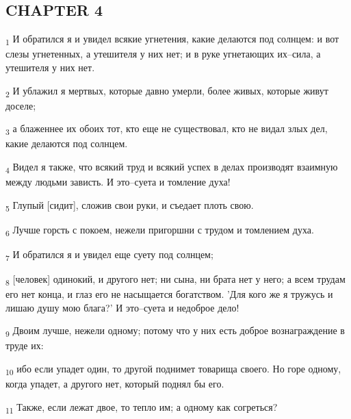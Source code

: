 \subsection{CHAPTER 4}
\begin{tcolorbox}
\textsubscript{1} И обратился я и увидел всякие угнетения, какие делаются под солнцем: и вот слезы угнетенных, а утешителя у них нет; и в руке угнетающих их--сила, а утешителя у них нет.
\end{tcolorbox}
\begin{tcolorbox}
\textsubscript{2} И ублажил я мертвых, которые давно умерли, более живых, которые живут доселе;
\end{tcolorbox}
\begin{tcolorbox}
\textsubscript{3} а блаженнее их обоих тот, кто еще не существовал, кто не видал злых дел, какие делаются под солнцем.
\end{tcolorbox}
\begin{tcolorbox}
\textsubscript{4} Видел я также, что всякий труд и всякий успех в делах производят взаимную между людьми зависть. И это--суета и томление духа!
\end{tcolorbox}
\begin{tcolorbox}
\textsubscript{5} Глупый [сидит], сложив свои руки, и съедает плоть свою.
\end{tcolorbox}
\begin{tcolorbox}
\textsubscript{6} Лучше горсть с покоем, нежели пригоршни с трудом и томлением духа.
\end{tcolorbox}
\begin{tcolorbox}
\textsubscript{7} И обратился я и увидел еще суету под солнцем;
\end{tcolorbox}
\begin{tcolorbox}
\textsubscript{8} [человек] одинокий, и другого нет; ни сына, ни брата нет у него; а всем трудам его нет конца, и глаз его не насыщается богатством. 'Для кого же я тружусь и лишаю душу мою блага?' И это--суета и недоброе дело!
\end{tcolorbox}
\begin{tcolorbox}
\textsubscript{9} Двоим лучше, нежели одному; потому что у них есть доброе вознаграждение в труде их:
\end{tcolorbox}
\begin{tcolorbox}
\textsubscript{10} ибо если упадет один, то другой поднимет товарища своего. Но горе одному, когда упадет, а другого нет, который поднял бы его.
\end{tcolorbox}
\begin{tcolorbox}
\textsubscript{11} Также, если лежат двое, то тепло им; а одному как согреться?
\end{tcolorbox}
